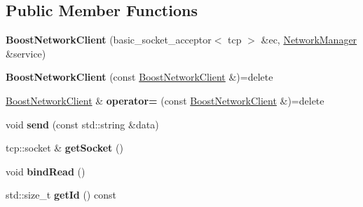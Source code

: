 \subsection*{Public Member Functions}
\begin{DoxyCompactItemize}
\item 
\mbox{\label{classbbl_1_1srv_1_1_boost_network_client_ac1fb8f11d0beaf53d95f23cd4d0e090c}} 
{\bfseries Boost\+Network\+Client} (basic\+\_\+socket\+\_\+acceptor$<$ tcp $>$ \&ec, \hyperlink{classbbl_1_1srv_1_1_network_manager}{Network\+Manager} \&service)
\item 
\mbox{\label{classbbl_1_1srv_1_1_boost_network_client_abf9374c65de4a17a64f3fe2555c0290a}} 
{\bfseries Boost\+Network\+Client} (const \hyperlink{classbbl_1_1srv_1_1_boost_network_client}{Boost\+Network\+Client} \&)=delete
\item 
\mbox{\label{classbbl_1_1srv_1_1_boost_network_client_ab68bde7428536219fa926cd514741406}} 
\hyperlink{classbbl_1_1srv_1_1_boost_network_client}{Boost\+Network\+Client} \& {\bfseries operator=} (const \hyperlink{classbbl_1_1srv_1_1_boost_network_client}{Boost\+Network\+Client} \&)=delete
\item 
\mbox{\label{classbbl_1_1srv_1_1_boost_network_client_a72406d7c6c06d2da24c83415645d309e}} 
void {\bfseries send} (const std\+::string \&data)
\item 
\mbox{\label{classbbl_1_1srv_1_1_boost_network_client_a5ee43cb5d04b84d98193ee1f162036e3}} 
tcp\+::socket \& {\bfseries get\+Socket} ()
\item 
\mbox{\label{classbbl_1_1srv_1_1_boost_network_client_a7fdbcb32b3add5542922a37b7514a866}} 
void {\bfseries bind\+Read} ()
\item 
\mbox{\label{classbbl_1_1srv_1_1_boost_network_client_ab9709338ea93ed1d02e67ada3a805adf}} 
std\+::size\+\_\+t {\bfseries get\+Id} () const
\item 
\mbox{\label{classbbl_1_1srv_1_1_boost_network_client_a065acdf4084b7a8661c973df24f1459f}} 

\end{DoxyCompactItemize}
